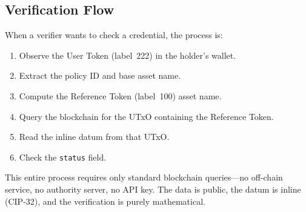\subsection{Verification Flow}

When a verifier wants to check a credential, the process is:

\begin{enumerate}[nosep]
  \item Observe the User Token (label~222) in the holder's wallet.
  \item Extract the policy ID and base asset name.
  \item Compute the Reference Token (label~100) asset name.
  \item Query the blockchain for the UTxO containing the Reference Token.
  \item Read the inline datum from that UTxO.
  \item Check the \texttt{status} field.
\end{enumerate}

This entire process requires only standard blockchain queries---no off-chain
service, no authority server, no API key.  The data is public, the datum is
inline (CIP-32), and the verification is purely mathematical.

